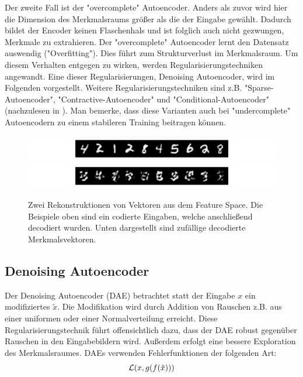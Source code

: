 Der zweite Fall ist der "overcomplete" Autoencoder. Anders als zuvor wird hier die Dimension des Merkmalsraums größer als die der Eingabe gewählt. Dadurch bildet der Encoder keinen Flaschenhals und ist folglich auch nicht gezwungen, Merkmale zu extrahieren. Der "overcomplete" Autoencoder lernt den Datensatz auswendig ("Overfitting"). Dies führt zum Strukturverlust im Merkmalsraum. Um diesem Verhalten entgegen zu wirken, werden Regularisierungstechniken angewandt. Eine dieser Regularisierungen, Denoising Autoencoder, wird im Folgenden vorgestellt. Weitere Regularisierungstechniken sind z.B. "Sparse-Autoencoder", "Contractive-Autoencoder" und "Conditional-Autoencoder" (nachzulesen in \cite{LopezPinaya2019}). Man bemerke, dass diese Varianten auch bei "undercomplete" Autoencodern zu einem stabileren Training beitragen können.

\begin{figure}[hbt]
  \centering
  \includegraphics[width=\textwidth]{gfx/literature/reals}
  \includegraphics[width=\textwidth]{gfx/literature/fakes}
  \caption{Zwei Rekonstruktionen von Vektoren aus dem Feature Space. Die Beispiele oben sind ein codierte Eingaben, welche anschließend decodiert wurden. Unten dargestellt sind zufällige decodierte Merkmalsvektoren.}
  \label{fig:ae_reconstruction}
\end{figure}


\subsection{Denoising Autoencoder}\label{sec:dae}
Der Denoising Autoencoder (DAE) betrachtet statt der Eingabe $x$ ein modifiziertes $\tilde{x}$. Die Modifikation wird durch Addition von Rauschen z.B. aus einer uniformen oder einer Normalverteilung erreicht. Diese Regularisierungstechnik führt offensichtlich dazu, dass der DAE robust gegenüber Rauschen in den Eingabebildern wird. Außerdem erfolgt eine bessere Exploration des Merkmalsraumes. DAEs verwenden Fehlerfunktionen der folgenden Art:
\begin{equation}\label{eq:DAE}
  \mathcal{L}(x, g(f(\tilde{x})))
\end{equation}

